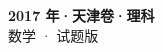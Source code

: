 \documentclass[zihao=-4, a4paper]{ctexart}
\begin{document}
\begin{center}
  {\Large\bfseries 2017 年·天津卷·理科}\\[4pt]
  {\large 数学 · 试题版}
\end{center}
\medskip
{}

\end{document}
